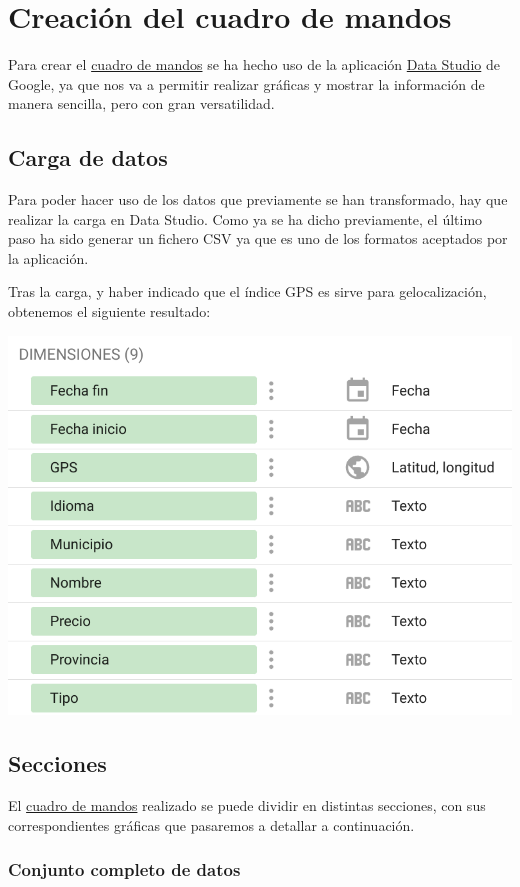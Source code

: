 \documentclass{\ClassPath/viu-tfm-template}
\begin{document}
\chapter{Creación del cuadro de mandos}

Para crear el \href{https://datastudio.google.com/reporting/2322c44e-ad75-4243-a4a5-257be6d754bf/page/9AT6C}{cuadro de mandos} se ha hecho uso de la aplicación \href{https://datastudio.google.com/}{Data Studio} de Google, ya que nos va a permitir realizar gráficas y mostrar la información de manera sencilla, pero con gran versatilidad.

\section{Carga de datos}
Para poder hacer uso de los datos que previamente se han transformado, hay que realizar la carga en Data Studio. Como ya se ha dicho previamente, el último paso ha sido generar un fichero CSV ya que es uno de los formatos aceptados por la aplicación.

Tras la carga, y haber indicado que el índice GPS es sirve para gelocalización, obtenemos el siguiente resultado:

\begin{center}
    \includegraphics[width=0.6\linewidth]{img/datos.png}
\end{center}

\section{Secciones}

El \href{https://datastudio.google.com/reporting/2322c44e-ad75-4243-a4a5-257be6d754bf/page/9AT6C}{cuadro de mandos} realizado se puede dividir en distintas secciones, con sus correspondientes gráficas que pasaremos a detallar a continuación.


\subsection{Conjunto completo de datos}
\end{document}
